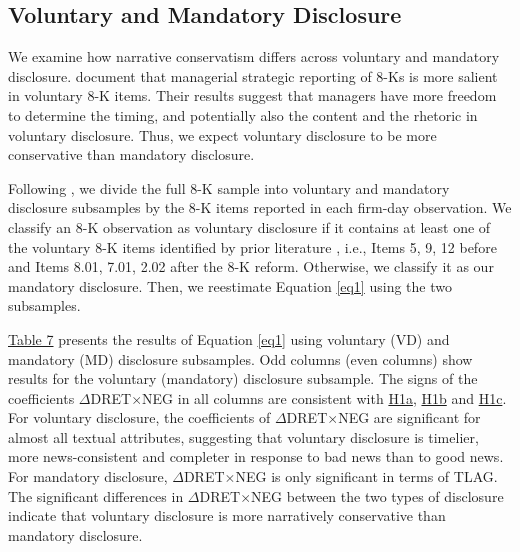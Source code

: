\documentclass[letterpaper,12pt]{article}
\begin{document}
\begin{spacing}{1.5}
\subsection{Voluntary and Mandatory Disclosure}
\noindent We examine how narrative conservatism differs across voluntary and mandatory disclosure.  document that managerial strategic reporting of 8-Ks is more salient in voluntary 8-K items. Their results suggest that managers have more freedom to determine the timing, and potentially also the content and the rhetoric in voluntary disclosure. Thus, we expect voluntary disclosure to be more conservative than mandatory disclosure.

Following , we divide the full 8-K sample into voluntary and mandatory disclosure subsamples by the 8-K items reported in each firm-day observation. We classify an 8-K observation as voluntary disclosure if it contains at least one of the voluntary 8-K items identified by prior literature \cite{lermanNewForm8K2010, heMeasuringDisclosureUsing2020}, i.e., Items 5, 9, 12 before and Items 8.01, 7.01, 2.02 after the 8-K reform. Otherwise, we classify it as our mandatory disclosure. Then, we reestimate Equation \eqref{eq1} using the two subsamples. 

\hyperref[T7]{Table 7} presents the results of Equation \eqref{eq1} using voluntary (VD) and mandatory (MD) disclosure subsamples. Odd columns (even columns) show results for the voluntary (mandatory) disclosure subsample. The signs of the coefficients $\Delta$DRET$\times$NEG in all columns are consistent with \hyperref[hyp:h1a]{H1a}, \hyperref[hyp:h1b]{H1b} and \hyperref[hyp:h1c]{H1c}. For voluntary disclosure, the coefficients of $\Delta$DRET$\times$NEG are significant for almost all textual attributes, suggesting that voluntary disclosure is timelier, more news-consistent and completer in response to bad news than to good news. For mandatory disclosure, $\Delta$DRET$\times$NEG is only significant in terms of TLAG. The significant differences in $\Delta$DRET$\times$NEG between the two types of disclosure indicate that voluntary disclosure is more narratively conservative than mandatory disclosure.


\end{spacing}
\end{document}
